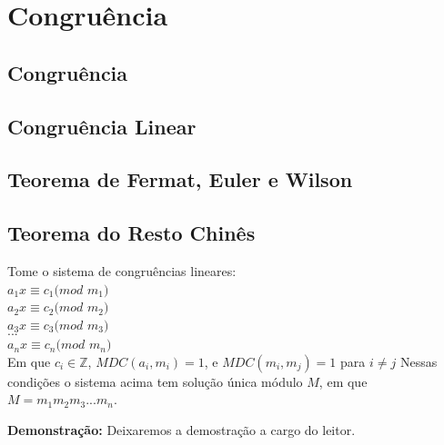 
\chapter{Congruência} %

\label{Chapter2} %


\section{Congruência}




\section{Congruência Linear}




\section{Teorema de Fermat, Euler e Wilson}




\section{Teorema do Resto Chinês}

\begin{theorem}
Tome o sistema de congruências lineares:\\

$a_1x \equiv c_1 (mod$ $m_1)$\\
$a_2x \equiv c_2 (mod$ $m_2)$\\
$a_3x \equiv c_3 (mod$ $m_3)$\\
$...$\\
$a_nx \equiv c_n (mod$ $m_n)$\\

Em que $c_i \in \mathbb{Z}$, $MDC(a_i,m_i) = 1$, e $MDC(m_i, m_j) = 1$ para $i \neq j$
Nessas condições o sistema acima tem solução única módulo $M$, em que $M = m_1m_2m_3...m_n$.
\end{theorem}
\textbf{Demonstração:}
Deixaremos a demostração a cargo do leitor.

